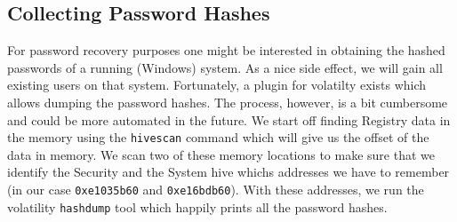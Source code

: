 \documentclass[a4paper,
    11pt,
    normalheadings,
    parindent,
    UKenglish,
    abstracton,
    ]{scrartcl}
\begin{document}
\subsection{Collecting Password Hashes}
For password recovery purposes one might be interested in obtaining the hashed passwords of a running (Windows) system.
As a nice side effect, we will gain all existing users on that system.
Fortunately, a plugin for volatilty exists which allows dumping the password hashes.
The process, however, is a bit cumbersome and could be more automated in the future.
We start off finding Registry data in the memory using the \texttt{hivescan} command which will give us the offset of the data in memory.
We scan two of these memory locations to make sure that we identify the Security and the System hive whichs addresses we have to remember (in our case \texttt{0xe1035b60} and \texttt{0xe16bdb60}).
With these addresses, we run the volatility \texttt{hashdump} tool which happily prints all the password hashes.
\end{document}
